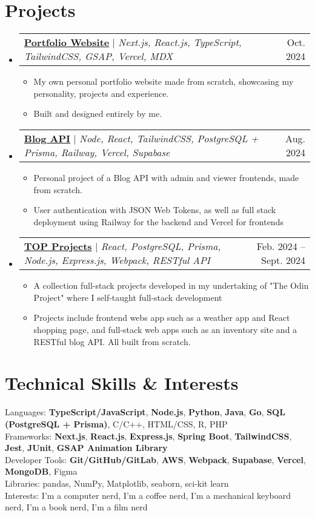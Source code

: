 \documentclass[letterpaper,11pt]{article}
\makeatletter
\newcommand{\resumeItem}[1]{
  \item\small{
    {#1 \vspace{-2pt}}
  }
}
\newcommand{\resumeProjectHeading}[2]{
    \item
    \begin{tabular*}{0.97\textwidth}{l@{\extracolsep{\fill}}r}
      \small#1 & #2 \\
    \end{tabular*}\vspace{-7pt}
}
\newcommand{\resumeSubHeadingListStart}{\begin{itemize}[leftmargin=0.15in, label={}]}
\newcommand{\resumeSubHeadingListEnd}{\end{itemize}}
\newcommand{\resumeItemListStart}{\begin{itemize}}
\newcommand{\resumeItemListEnd}{\end{itemize}\vspace{-5pt}}
\makeatother
\begin{document}
\section{Projects}
    \resumeSubHeadingListStart
      \resumeProjectHeading
        {\textbf{\href{https://edgr.live}{Portfolio Website}} $|$ \emph{Next.js, React.js, TypeScript, TailwindCSS, GSAP, Vercel, MDX}}{Oct. 2024}
          \resumeItemListStart
          \resumeItem{My own personal portfolio website made from scratch, showcasing my personality, projects and experience.}
          \resumeItem{Built and designed entirely by me.}
          \resumeItemListEnd
      \resumeProjectHeading
        {\textbf{\href{https://edgr-odin-blog-access.vercel.app/}{Blog API}} $|$ \emph{Node, React, TailwindCSS, PostgreSQL + Prisma, Railway, Vercel, Supabase}}{Aug. 2024}
          \resumeItemListStart
            \resumeItem{Personal project of a Blog API with admin and viewer frontends, made from scratch.}
            \resumeItem{User authentication with JSON Web Tokens, as well as full stack deployment using Railway for the backend and Vercel for frontends}
          \resumeItemListEnd
        \resumeProjectHeading
        {\textbf{\href{https://safarinexus.github.io/edgr-odinprojects/}{TOP Projects}} $|$ \emph{React, PostgreSQL, Prisma, Node.js, Express.js, Webpack, RESTful API}}{Feb. 2024 -- Sept. 2024}
          \resumeItemListStart
          \resumeItem{A collection full-stack projects developed in my undertaking of "The Odin Project" where I self-taught full-stack development}
          \resumeItem{Projects include frontend webs app such as a weather app and React shopping page, and full-stack web apps such as an inventory site and a RESTful blog API. All built from scratch.}
          \resumeItemListEnd
    \resumeSubHeadingListEnd


\section{Technical Skills \& Interests}
 \begin{itemize}[leftmargin=0.15in, label={}]
    \small{\item{
      {Languages}{: \textbf{TypeScript/JavaScript}, \textbf{Node.js}, \textbf{Python}, \textbf{Java}, \textbf{Go}, \textbf{SQL (PostgreSQL + Prisma)}, C/C++, HTML/CSS, R, PHP} \\
      {Frameworks}{: \textbf{Next.js}, \textbf{React.js}, \textbf{Express.js}, \textbf{Spring Boot}, \textbf{TailwindCSS}, \textbf{Jest}, \textbf{JUnit}, \textbf{GSAP Animation Library}} \\
      {Developer Tools}{: \textbf{Git/GitHub/GitLab}, \textbf{AWS}, \textbf{Webpack}, \textbf{Supabase}, \textbf{Vercel}, \textbf{MongoDB}, Figma} \\
     {Libraries}{: pandas, NumPy, Matplotlib, seaborn, sci-kit learn} \\
     {Interests}{: I’m a computer nerd, I’m a coffee nerd, I’m a mechanical keyboard nerd, I’m a book nerd, I’m a film nerd}
    }}
 \end{itemize}
\end{document}
